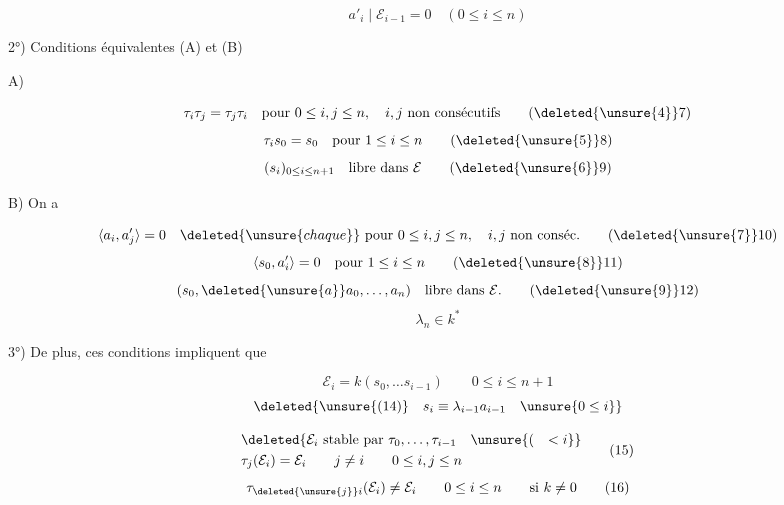 \[\boxed{a'_i\mid\mathcal E_{i-1}=0\quad(0\leq i\leq n)}\]

2°) Conditions équivalentes (A) et (B)

A)   

\[\tau_i\tau_j=\tau_j\tau_i\quad\text{pour }0\leq i,j\leq n,\quad i,j\text{ non consécutifs}\tag*{(\deleted{\unsure{4}}7)}\]
\[\tau_i s_0=s_0\quad\text{pour }1\leq i\leq n\tag*{(\deleted{\unsure{5}}8)}\]
\[(s_i)_{0\leq i\leq n+1}\quad\text{libre dans }\mathcal E\tag*{(\deleted{\unsure{6}}9)}\]


B) On a

\[\langle a_i,a'_j\rangle=0\quad\deleted{\unsure{chaque}}\ \text{pour }0\leq i,j\leq n,\quad i,j\text{ non conséc.}\tag*{(\deleted{\unsure{7}}10)}\]
\[\langle s_0,a'_i\rangle=0\quad\text{pour }1\leq i\leq n\tag*{(\deleted{\unsure{8}}11)}\]
\[(s_0,\deleted{\unsure{a}}a_0,\ldots,a_n)\quad\text{libre dans }\mathcal E.\tag*{(\deleted{\unsure{9}}12)}\]
\[\lambda_n\in k^*\tag*{(13)}\]

3°) De plus, ces conditions impliquent que

\[\mathcal E_i=k(s_0,\ldots s_{i-1})\qquad0\leq i\leq n+1\tag*{(14)}\]
\[\deleted{\unsure{(14)}\quad s_i\equiv\lambda_{i-1}a_{i-1}\quad\unsure{0\leq i}}\]

\[\begin{aligned}&\deleted{\mathcal E_i\ \text{stable par }\tau_0,\ldots,\tau_{i-1}\quad\unsure{(\quad<i}}\\
&\tau_j(\mathcal E_i)=\mathcal E_i\qquad j\ne i\qquad0\leq i,j\leq n\end{aligned}\tag*{(15)}\]
\[\tau_{\deleted{\unsure{j}}i}(\mathcal E_i)\ne\mathcal E_i\qquad0\leq i\leq n\qquad\text{si }k\ne0\tag*{(16)}\]

